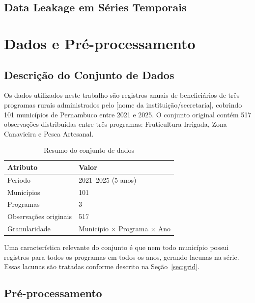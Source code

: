 \documentclass[12pt, a4paper]{article}
\begin{document}
\subsection{Data Leakage em Séries Temporais}


\newpage
\section{Dados e Pré-processamento}
\label{sec:dados}

\subsection{Descrição do Conjunto de Dados}

Os dados utilizados neste trabalho são registros anuais de beneficiários de
três programas rurais administrados pelo [nome da instituição/secretaria],
cobrindo 101 municípios de Pernambuco entre 2021 e 2025. O conjunto original
contém 517 observações distribuídas entre três programas: Fruticultura Irrigada,
Zona Canavieira e Pesca Artesanal.

\begin{table}[H]
  \centering
  \caption{Resumo do conjunto de dados}
  \label{tab:dados_resumo}
  \begin{tabular}{ll}
    \toprule
    \textbf{Atributo}          & \textbf{Valor}              \\
    \midrule
    Período                    & 2021–2025 (5 anos)          \\
    Municípios                 & 101                         \\
    Programas                  & 3                           \\
    Observações originais      & 517                         \\
    Granularidade              & Município $\times$ Programa $\times$ Ano \\
    \bottomrule
  \end{tabular}
\end{table}

Uma característica relevante do conjunto é que nem todo município possui
registros para todos os programas em todos os anos, gerando lacunas na série.
Essas lacunas são tratadas conforme descrito na Seção~\ref{sec:grid}.

\subsection{Pré-processamento}
\end{document}
